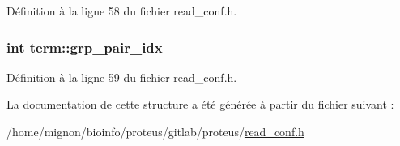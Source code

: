Définition à la ligne 58 du fichier read\+\_\+conf.\+h.

\hypertarget{structterm_aad99db478acafec56675d26230546978}{
\subsubsection[{grp\+\_\+pair\+\_\+idx}]{\setlength{\rightskip}{0pt plus 5cm}int term\+::grp\+\_\+pair\+\_\+idx}}\label{structterm_aad99db478acafec56675d26230546978}


Définition à la ligne 59 du fichier read\+\_\+conf.\+h.



La documentation de cette structure a été générée à partir du fichier suivant \+:\begin{DoxyCompactItemize}
\item 
/home/mignon/bioinfo/proteus/gitlab/proteus/\hyperlink{read__conf_8h}{read\+\_\+conf.\+h}\end{DoxyCompactItemize}
